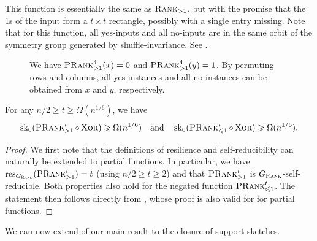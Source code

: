 \documentclass{article}
\begin{document}
This function is essentially the same as $\operatorname{\textsc{Rank}}_{>1}$, but with the promise that the 1s of the input form a $t\times t$ rectangle, possibly with a single entry missing. Note that for this function, all yes-inputs and all no-inputs are in the same orbit of the symmetry group generated by shuffle-invariance. See .

\begin{figure}
    \centering
    
    \caption{We have $\operatorname{\textsc{PRank}}^4_{>1}(x) = 0$ and $\operatorname{\textsc{PRank}}^4_{>1}(y) = 1$. By permuting rows and columns, all yes-instances and all no-instances can be obtained from $x$ and $y$, respectively.}
    \label{fig:promise}
\end{figure}



\begin{boxlemma}\label{lem:prom-bound}
    For any $n/2 \geq t \geq \Omega(n^{1/6})$, we have 
    \[
        \operatorname{sk}_0(\operatorname{\textsc{PRank}}^t_{>1}\circ\operatorname{\textsc{Xor}}) \geqslant \Omega(n^{1/6}) \quad\text{and}\quad
        \operatorname{sk}_0(\operatorname{\textsc{PRank}}^t_{\leqslant1}\circ\operatorname{\textsc{Xor}}) \geqslant \Omega(n^{1/6}).
    \]
\end{boxlemma}

\begin{proof}
    We first note that the definitions of resilience and self-reducibility can naturally be extended to partial functions. In particular, we have $\operatorname{res}_{G_{\operatorname{\textsc{Rank}}}}(\operatorname{\textsc{PRank}}_{>1}^t) = t$ (using $n/2\geq t \geq 2$) and that $\operatorname{\textsc{PRank}}_{>1}^t$ is $G_{\operatorname{\textsc{Rank}}}$-self-reducible.
    Both properties also hold for the negated function $\operatorname{\textsc{PRank}}^t_{\leqslant 1}$.
    The statement then follows directly from , whose proof is also valid for for partial functions.
\end{proof}

We can now extend of our main result to the closure of support-sketches.
\end{document}
